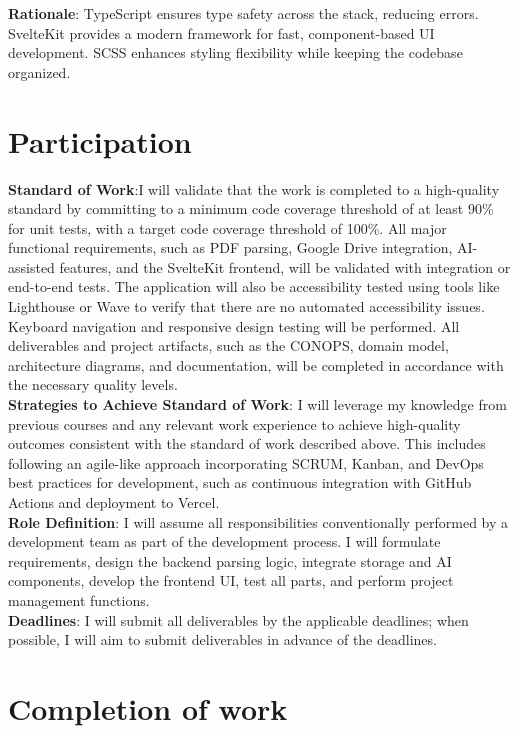 \documentclass[12pt]{article}
\begin{document}
\textbf{Rationale}: TypeScript ensures type safety across the stack, reducing errors. SvelteKit provides a modern framework for fast, component-based UI development. SCSS enhances styling flexibility while keeping the codebase organized.

\section*{Participation}

\textbf{Standard of Work}:I will validate that the work is completed to a high-quality standard by committing to a minimum code coverage threshold of at least 90\% for unit tests, with a target code coverage threshold of 100\%. All major functional requirements, such as PDF parsing, Google Drive integration, AI-assisted features, and the SvelteKit frontend, will be validated with integration or end-to-end tests.
The application will also be accessibility tested using tools like Lighthouse or Wave to verify that there are no automated accessibility issues. Keyboard navigation and responsive design testing will be performed. All deliverables and project artifacts, such as the CONOPS, domain model, architecture diagrams, and documentation, will be completed in accordance with the necessary quality levels. \\

\textbf{Strategies to Achieve Standard of Work}: I will leverage my knowledge from previous courses and any relevant work experience to achieve high-quality outcomes consistent with the standard of work described above. This includes following an agile-like approach incorporating SCRUM, Kanban, and DevOps best practices for development, such as continuous integration with GitHub Actions and deployment to Vercel. \\

\textbf{Role Definition}: I will assume all responsibilities conventionally performed by a development team as part of the development process. I will formulate requirements, design the backend parsing logic, integrate storage and AI components, develop the frontend UI, test all parts, and perform project management functions. \\

\textbf{Deadlines}: I will submit all deliverables by the applicable deadlines; when possible, I will aim to submit deliverables in advance of the deadlines.

\section{Completion of work}
\end{document}
